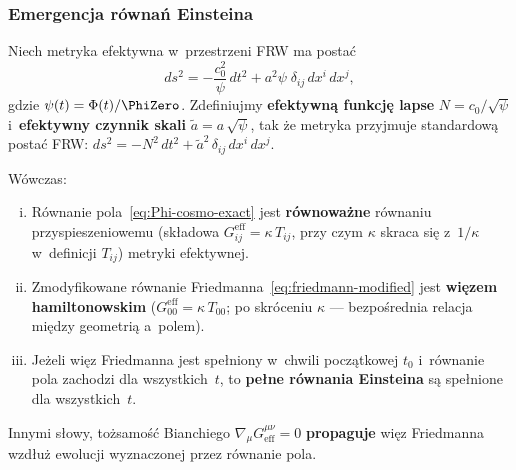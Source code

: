 \subsubsection{Emergencja r\'owna\'n Einsteina}\label{sssec:einstein-emergence}

\begin{theorem}%
\label{thm:einstein-emergence}
Niech metryka efektywna w~przestrzeni FRW ma posta\'c
\begin{equation}\label{eq:metric-eff-FRW}
  ds^2 = -\frac{c_0^2}{\psi}\,dt^2
       + a^2\psi\;\delta_{ij}\,dx^i\,dx^j,
\end{equation}
gdzie $\psi(t) = \Phi(t)/\PhiZero$.
Zdefiniujmy \textbf{efektywn\k{a} funkcj\k{e} lapse}
$N = c_0/\sqrt{\psi}$ i~\textbf{efektywny czynnik skali}
$\tilde a = a\,\sqrt{\psi}$, tak \.ze metryka przyjmuje
standardow\k{a} posta\'c FRW:
$ds^2 = -N^2\,dt^2 + \tilde a^2\,\delta_{ij}\,dx^i\,dx^j$.

\medskip
W\'owczas:
\begin{enumerate}[(i)]
  \item R\'ownanie pola~\eqref{eq:Phi-cosmo-exact} jest
        \textbf{r\'ownowa\.zne} r\'ownaniu przyspieszeniowemu
        (sk\l{}adowa $G^{\mathrm{eff}}_{ij} = \kappa\,T_{ij}$,
        przy czym $\kappa$ skraca si\k{e} z~$1/\kappa$
        w~definicji $T_{ij}$) metryki efektywnej.
  \item Zmodyfikowane r\'ownanie Friedmanna~\eqref{eq:friedmann-modified}
        jest \textbf{wi\k{e}zem hamiltonowskim}
        ($G^{\mathrm{eff}}_{00} = \kappa\,T_{00}$;
        po skr\'oceniu $\kappa$ --- bez\-po\-\'sred\-nia
        relacja mi\k{e}dzy geometri\k{a} a~polem).
  \item Je\.zeli wi\k{e}z Friedmanna jest spe\l{}niony
        w~chwili pocz\k{a}tkowej $t_0$ i~r\'ownanie pola
        zachodzi dla wszystkich~$t$, to \textbf{pe\l{}ne
        r\'ownania Einsteina} s\k{a} spe\l{}nione
        dla wszystkich~$t$.
\end{enumerate}
Innymi s\l{}owy, to\.zsamo\'s\'c Bianchiego
$\nabla_\mu G^{\mu\nu}_{\mathrm{eff}} = 0$
\textbf{propaguje} wi\k{e}z Friedmanna wzd\l{}u\.z ewolucji
wyznaczonej przez r\'ownanie pola.
\end{theorem}

